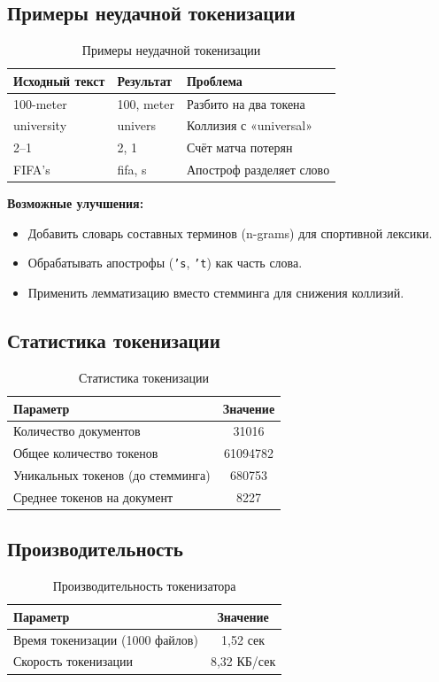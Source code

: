\documentclass[a4paper,12pt]{article}
\begin{document}
\subsection{Примеры неудачной токенизации}
\begin{table}[H]
\centering
\begin{tabular}{|l|l|l|}
\hline
\textbf{Исходный текст} & \textbf{Результат} & \textbf{Проблема} \\
\hline
100-meter & 100, meter & Разбито на два токена \\
\hline
university & univers & Коллизия с «universal» \\
\hline
2--1 & 2, 1 & Счёт матча потерян \\
\hline
FIFA's & fifa, s & Апостроф разделяет слово \\
\hline
\end{tabular}
\caption{Примеры неудачной токенизации}
\end{table}

\textbf{Возможные улучшения:}
\begin{itemize}
    \item Добавить словарь составных терминов (n-grams) для спортивной лексики.
    \item Обрабатывать апострофы (\texttt{'s}, \texttt{'t}) как часть слова.
    \item Применить лемматизацию вместо стемминга для снижения коллизий.
\end{itemize}

\subsection{Статистика токенизации}
\begin{table}[H]
\centering
\begin{tabular}{|l|c|}
\hline
\textbf{Параметр} & \textbf{Значение} \\
\hline
Количество документов & 31016 \\
\hline
Общее количество токенов & 61094782 \\
\hline
Уникальных токенов (до стемминга) & 680753 \\
\hline
Среднее токенов на документ & 8227 \\
\hline
\end{tabular}
\caption{Статистика токенизации}
\end{table}

\subsection{Производительность}
\begin{table}[H]
\centering
\begin{tabular}{|l|c|}
\hline
\textbf{Параметр} & \textbf{Значение} \\
\hline
Время токенизации (1000 файлов) & 1,52 сек \\
\hline
Скорость токенизации & 8,32 КБ/сек \\
\hline
\end{tabular}
\caption{Производительность токенизатора}
\end{table}
\end{document}
